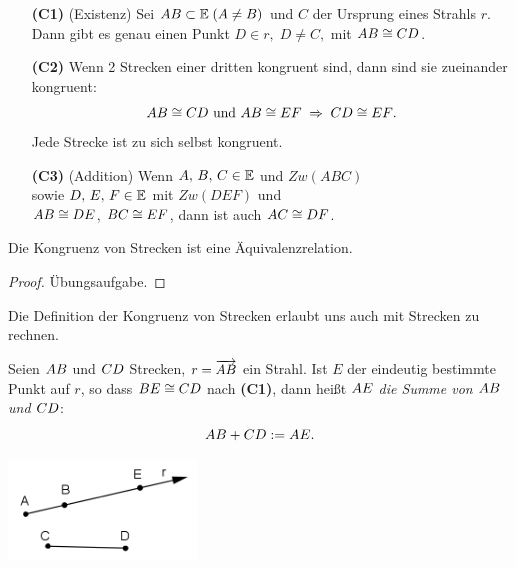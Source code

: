 \begin{enumerate}
    \item[{\bf (C1)}] (Existenz) Sei ${AB} \subset \mathbb E\; (A \neq B)$ und $C$ der Ursprung eines
        Strahls $r$. Dann gibt es genau einen Punkt $D \in r,\; D \neq C,$ mit ${AB} \cong
        {CD}$.


    \item[{\bf (C2)}] Wenn 2 Strecken einer dritten kongruent sind, dann sind sie zueinander kongruent:
        $$
            {AB} \cong {CD} \mbox{ und } {AB} \cong {EF}\; \Rightarrow\; {CD} \cong {EF}.
        $$
        Jede Strecke ist zu sich selbst kongruent.

    \item[{\bf (C3)}] (Addition) Wenn $A,\,B,\,C\in \mathbb E$ und $Zw(ABC)$\\
        sowie $D,\, E,\, F \in \mathbb E$ mit $Zw(DEF)$ und\\
        ${AB} \cong {DE}$, ${BC} \cong {EF}$, dann ist auch ${AC} \cong
        {DF}$.

\end{enumerate}

\begin{thm}\label{thm:satz.s1d}
    Die Kongruenz von Strecken ist eine Äquivalenzrelation.
\end{thm}

\begin{proof}
    Übungsaufgabe.
\end{proof}

Die Definition der Kongruenz von Strecken erlaubt uns auch mit Strecken zu rechnen.

\begin{defi}\label{def:d1a}
    Seien ${AB}$ und ${CD}$ Strecken, $r = \mbox{${\overrightarrow{AB}}$}$ ein Strahl. Ist $E$ der eindeutig
    bestimmte Punkt auf $r$, so dass ${BE} \cong {CD}$ nach \textbf{(C1)}, dann heißt
    ${AE}$ {\em die Summe von ${AB}$ und ${CD}$}:
    $$
        {AB} + {CD} := {AE}.
    $$
\end{defi}

\centerline{\includegraphics[width=5cm]{BILDER/1-2-02-Add.png}}

